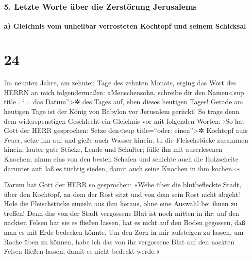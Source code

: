 \hypertarget{letzte-worte-uxfcber-die-zerstuxf6rung-jerusalems}{%
\subsubsection{5. Letzte Worte über die Zerstörung
Jerusalems}\label{letzte-worte-uxfcber-die-zerstuxf6rung-jerusalems}}

\hypertarget{a-gleichnis-vom-unheilbar-verrosteten-kochtopf-und-seinem-schicksal}{%
\paragraph{a) Gleichnis vom unheilbar verrosteten Kochtopf und seinem
Schicksal}\label{a-gleichnis-vom-unheilbar-verrosteten-kochtopf-und-seinem-schicksal}}

\hypertarget{section-23}{%
\section{24}\label{section-23}}

Im neunten Jahre, am zehnten Tage des zehnten Monats,
erging das Wort des HERRN an mich folgendermaßen:
»Menschensohn, schreibe dir den Namen\textless sup
title=``=~das Datum''\textgreater✲ des Tages auf, eben dieses heutigen
Tages! Gerade am heutigen Tage ist der König von Babylon vor Jerusalem
gerückt! So trage denn dem widerspenstigen Geschlecht ein
Gleichnis vor mit folgenden Worten: ›So hat Gott der HERR gesprochen:
Setze den\textless sup title=``oder: einen''\textgreater✲ Kochtopf aufs
Feuer, setze ihn auf und gieße auch Wasser hinein; tu die
Fleischstücke zusammen hinein, lauter gute Stücke, Lende und Schulter;
fülle ihn mit auserlesenen Knochen; nimm eins von den
besten Schafen und schichte auch die Holzscheite darunter auf; laß es
tüchtig sieden, damit auch seine Knochen in ihm kochen.‹«

Darum hat Gott der HERR so gesprochen: »Wehe über die
blutbefleckte Stadt, über den Kochtopf, an dem der Rost sitzt und von
dem sein Rost nicht abgeht! Hole die Fleischstücke einzeln aus ihm
heraus, ohne eine Auswahl bei ihnen zu treffen! Denn das
von der Stadt vergossene Blut ist noch mitten in ihr: auf den nackten
Felsen hat sie es fließen lassen, hat es nicht auf den Boden gegossen,
daß man es mit Erde bedecken könnte. Um den Zorn in mir
aufsteigen zu lassen, um Rache üben zu können, habe ich das von ihr
vergossene Blut auf den nackten Felsen fließen lassen, damit es nicht
bedeckt werde.«

